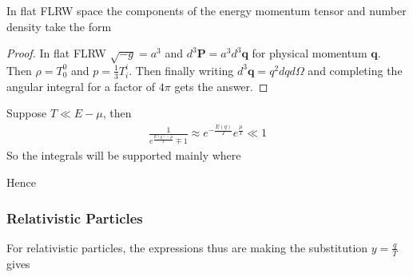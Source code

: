 \documentclass{article}
\begin{document}
\begin{prop}
In flat FLRW space the components of the energy momentum tensor and number density take the form 
\end{prop}
\begin{proof}
In flat FLRW $\sqrt{-g} = a^3$ and $d^3\bm{P} = a^3 d^3\bm{q}$ for physical momentum $\bm{q}$. Then $\rho = T^0_0$ and $p=\frac{1}{3}T^i_i$. Then finally writing $d^3\bm{q}=q^2 dq d\Omega$ and completing the angular integral for a factor of $4\pi$ gets the answer. 
\end{proof}
Suppose $T \ll E - \mu $, then 
\begin{align}\label{eq:CSM:4}
\frac{1}{e^\frac{E(q)-\mu}{T}\mp1} \approx  e^{-\frac{E(q)}{T}}e^{\frac{\mu}{T}} \ll 1 
\end{align}
So the integrals will be supported mainly where 

Hence 
\subsubsection*{Relativistic Particles}
For relativistic particles, the expressions thus are 
making the substitution $y = \frac{q}{T}$ gives 
\end{document}
